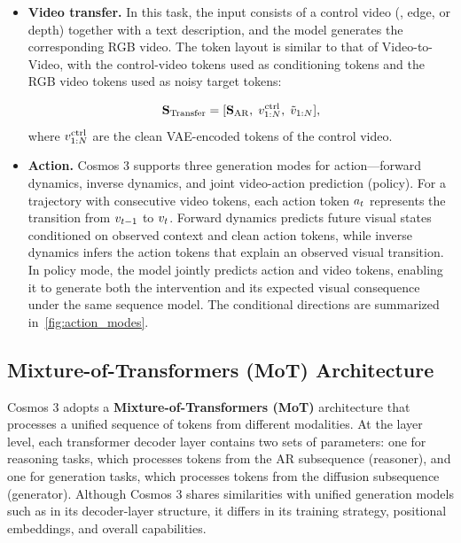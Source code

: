 \begin{itemize}
    \begin{equation}
    \mathbf{S}_{\mathrm{V2V}} = [\preseq,\; \vidtok_{1:P},\; \noisyvidtok_{P+1:N}],
    \end{equation}
    where $P$ is the number of conditioning latent frames. When $P=1$, the task becomes Image-to-Video, while $P>1$ corresponds to Video-to-Video. When audio is also generated, the audio tokens are appended similarly to the Text-to-Video case.

     \item \textbf{Video transfer.} In this task, the input consists of a control video (\eg, edge, or depth) together with a text description, and the model generates the corresponding RGB video. The token layout is similar to that of Video-to-Video, with the control-video tokens used as conditioning tokens and the RGB video tokens used as noisy target tokens:

     \begin{equation}
    \mathbf{S}_{\mathrm{Transfer}} = [\mathbf{S}_{\mathrm{AR}},\; v^{\mathrm{ctrl}}_{1:N},\; \tilde{v}_{1:N}],
    \end{equation}
    where $v^{\mathrm{ctrl}}_{1:N}$ are the clean VAE-encoded tokens of the control video.

    \item \textbf{Action.}
    Cosmos 3 supports three generation modes for action---forward dynamics, inverse dynamics, and joint video-action prediction (policy). For a trajectory with consecutive video tokens, each action token $a_{t}$ represents the transition from $v_{t{-}1}$ to $v_{t}$.
Forward dynamics predicts future visual states conditioned on observed context and clean action tokens, while inverse dynamics infers the action tokens that explain an observed visual transition.
In policy mode, the model jointly predicts action and video tokens, enabling it to generate both the intervention and its expected visual consequence under the same sequence model.
The conditional directions are summarized in~\cref{fig:action_modes}.

\end{itemize}


\subsection{Mixture-of-Transformers (MoT) Architecture}
\label{subsec::mot}

Cosmos 3 adopts a \textbf{Mixture-of-Transformers (MoT)} architecture that processes a unified sequence of tokens from different modalities. At the layer level, each transformer decoder layer contains two sets of parameters: one for reasoning tasks, which processes tokens from the AR subsequence (reasoner), and one for generation tasks, which processes tokens from the diffusion subsequence (generator). Although Cosmos 3 shares similarities with unified generation models such as \cite{deng2025bagel} in its decoder-layer structure, it differs in its training strategy, positional embeddings, and overall capabilities.

